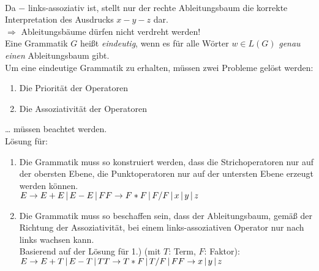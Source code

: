 \documentclass{scrreprt}
\begin{document}
\\
Da $-$ links-assoziativ ist, stellt nur der rechte Ableitungsbaum die korrekte Interpretation des Ausdrucks $x-y-z$ dar.\\
$\Rightarrow$ Ableitungsbäume dürfen nicht verdreht werden!\\
Eine Grammatik $G$ heißt \emph{eindeutig}, wenn es für alle Wörter $w \in L(G)$ \emph{genau einen} Ableitungsbaum gibt.\\
Um eine eindeutige Grammatik zu erhalten, müssen zwei Probleme gelöst werden:
\begin{enumerate}
\item Die Priorität der Operatoren
\item Die Assoziativität der Operatoren
\end{enumerate}
… müssen beachtet werden.\\
Lösung für:
\begin{enumerate}
\item Die Grammatik muss so konstruiert werden, dass die Strichoperatoren nur auf der obersten Ebene, die Punktoperatoren nur auf der untersten Ebene erzeugt werden können.\\
$E\to E+E \,|\, E-E \,|\, F \\
F \to F*F \,|\, F/F \,|\, x \,|\, y \,|\, z$
\item Die Grammatik muss so beschaffen sein, dass der Ableitungsbaum, gemäß der Richtung der Assoziativität, bei einem links-assoziativen Operator nur nach links wachsen kann.\\
Basierend auf der Lösung für 1.) (mit $T$: Term, $F$: Faktor):\\
$E\to E+T \,|\, E-T \,|\, T \\
T \to T*F \,|\, T/F \,|\, F\\
F \to x \,|\, y \,|\, z$
\end{enumerate}
\end{document}
